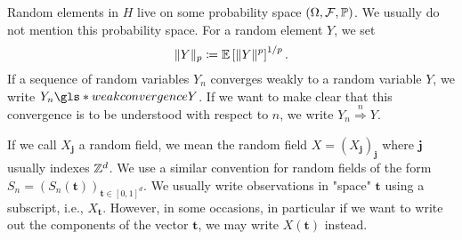 Random elements in $H$ live on some probability space $(\Omega, \mathcal{F}, \mathbb{P})$. We usually do not mention this probability space. For a random element $Y$, we set
\[ \|Y\|_p \coloneqq \mathbb{E}\left[\|Y\|^p\right]^{1/p}. \]
If a sequence of random variables $Y_n$ converges weakly to a random variable $Y$, we write $Y_n \gls*{weakconvergence} Y$. If we want to make clear that this convergence is to be understood with respect to $n$, we write $Y_n \stackrel{n}{\Rightarrow} Y$.

If we call $X_\mathbf{j}$ a random field, we mean the random field $X = (X_\mathbf{j})_{\mathbf{j}}$ where $\mathbf{j}$ usually indexes $\mathbb{Z}^d$. We use a similar convention for random fields of the form $S_n = (S_n(\mathbf{t}))_{\mathbf{t} \in [0,1]^d}$. We usually write observations in "space" $\mathbf{t}$ using a subscript, i.e., $X_\mathbf{t}$. However, in some occasions, in particular if we want to write out the components of the vector $\mathbf{t}$, we may write $X(\mathbf{t})$ instead.
